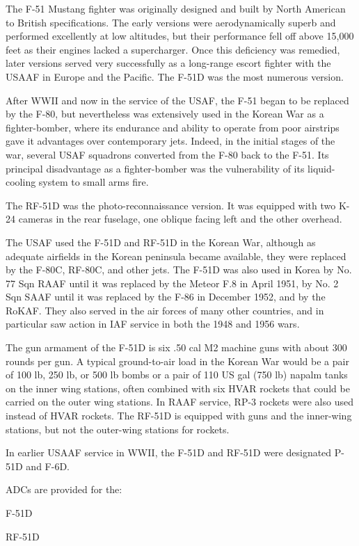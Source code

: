 

The F-51 Mustang fighter was originally designed and built by North American to British specifications. The early versions were aerodynamically superb and performed excellently at low altitudes, but their performance fell off above 15,000 feet as their engines lacked a supercharger. Once this deficiency was remedied, later versions served very successfully as a long-range escort fighter with the USAAF in Europe and the Pacific. The F-51D was the most numerous version.

After WWII and now in the service of the USAF, the F-51 began to be replaced by the F-80, but nevertheless was extensively used in the Korean War as a fighter-bomber, where its endurance and ability to operate from poor airstrips gave it advantages over contemporary jets. Indeed, in the initial stages of the war, several USAF squadrons converted from the F-80 back to the F-51. Its principal disadvantage as a fighter-bomber was the vulnerability of its liquid-cooling system to small arms fire.

The RF-51D was the photo-reconnaissance version. It was equipped with two K-24 cameras in the rear fuselage, one oblique facing left and the other overhead. 

The USAF used the F-51D and RF-51D in the Korean War, although as adequate airfields in the Korean peninsula became available, they were replaced by the F-80C, RF-80C, and other jets. The F-51D was also used in Korea by No. 77 Sqn RAAF until it was replaced by the Meteor F.8 in April 1951, by No. 2 Sqn SAAF until it was replaced by the F-86 in December 1952, and by the RoKAF. They also served in the air forces of many other countries, and in particular saw action in IAF service in both the 1948 and 1956 wars. 

The gun armament of the F-51D is six .50 cal M2 machine guns with about 300 rounds per gun. A typical ground-to-air load in the Korean War would be a pair of 100 lb, 250 lb, or 500 lb bombs or a pair of 110 US gal (750 lb) napalm tanks on the inner wing stations, often combined with six HVAR rockets that could be carried on the outer wing stations. In RAAF service, RP-3 rockets were also used instead of HVAR rockets. The RF-51D is equipped with guns and the inner-wing stations, but not the outer-wing stations for rockets.

In earlier USAAF service in WWII, the F-51D and RF-51D were designated P-51D and F-6D.

ADCs are provided for the:
\begin{adclist}
\item F-51D
\item RF-51D
\end{adclist}
